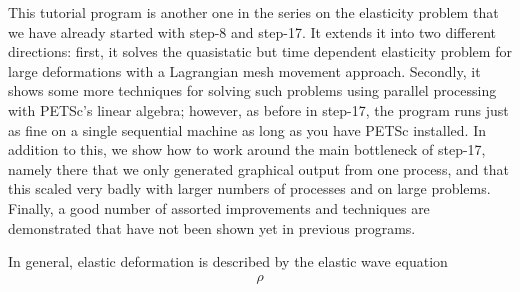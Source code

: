 \documentclass{article}
\begin{document}
This tutorial program is another one in the series on the elasticity problem
that we have already started with step-8 and step-17. It extends it into two
different directions: first, it solves the quasistatic but time dependent
elasticity problem for large deformations with a Lagrangian mesh movement
approach. Secondly, it shows some more techniques for solving such problems
using parallel processing with PETSc's linear algebra; however, as before in
step-17, the program runs just as fine on a single sequential machine as long
as you have PETSc installed. In addition to this, we show how to work around
the main bottleneck of step-17, namely there that we only generated graphical
output from one process, and that this scaled very badly with larger numbers
of processes and on large problems. Finally, a good number of assorted
improvements and techniques are demonstrated that have not been shown yet in
previous programs.

In general, elastic deformation is described by the elastic wave equation
\begin{gather*}
  \rho
\end{gather*}
\end{document}
